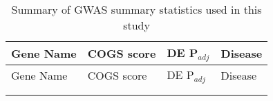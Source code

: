 
\begin{center}

\centering
\begin{longtable}{| L{5cm} | R{1.2cm} | R{1cm} | L{1.5cm} |}
\caption{Summary of GWAS summary statistics used in this study}\label{tab:ibd_genes}\\
  \hline{}   Gene Name & COGS score & DE P$_{adj}$ & Disease \\ \hline \hline  
  \endfirsthead
   \hline{}   Gene Name & COGS score & DE P$_{adj}$ & Disease \\ \hline \hline  
  \endhead
  \hline {}  \\ \hline 
  \endfoot
  \hline \hline 
  \endlastfoot


\end{longtable}
\end{center}
